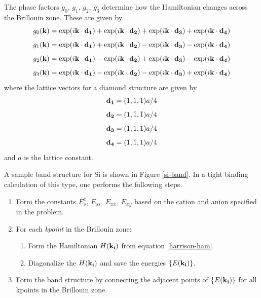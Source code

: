 The phase factors $g_0$, $g_1$, $g_2$, $g_3$ determine how the
Hamiltonian changes across the Brillouin zone. These are given by 
\begin{equation}
 g_0(\mathbf{k}) = \exp(i\mathbf{k}\cdot\mathbf{d_1})
    + \exp(i\mathbf{k}\cdot\mathbf{d_2})
    + \exp(i\mathbf{k}\cdot\mathbf{d_3})
    + \exp(i\mathbf{k}\cdot\mathbf{d_4})
\end{equation}
\begin{equation}
 g_1(\mathbf{k}) = \exp(i\mathbf{k}\cdot\mathbf{d_1})
    + \exp(i\mathbf{k}\cdot\mathbf{d_2})
    - \exp(i\mathbf{k}\cdot\mathbf{d_3})
    - \exp(i\mathbf{k}\cdot\mathbf{d_4})
\end{equation}
\begin{equation}
 g_2(\mathbf{k}) = \exp(i\mathbf{k}\cdot\mathbf{d_1})
    - \exp(i\mathbf{k}\cdot\mathbf{d_2})
    + \exp(i\mathbf{k}\cdot\mathbf{d_3})
    - \exp(i\mathbf{k}\cdot\mathbf{d_4})
\end{equation}
\begin{equation}
 g_3(\mathbf{k}) = \exp(i\mathbf{k}\cdot\mathbf{d_1})
    - \exp(i\mathbf{k}\cdot\mathbf{d_2})
    - \exp(i\mathbf{k}\cdot\mathbf{d_3})
    + \exp(i\mathbf{k}\cdot\mathbf{d_4})
\end{equation}
where the lattice vectors for a diamond structure are given by
\begin{equation}
 \mathbf{d_1} = (1,1,1)a/4
\end{equation}
\begin{equation}
 \mathbf{d_2} = (1,\bar{1},\bar{1})a/4
\end{equation}
\begin{equation}
 \mathbf{d_3} = (\bar{1},1,\bar{1})a/4
\end{equation}
\begin{equation}
 \mathbf{d_4} = (\bar{1},\bar{1},1)a/4
\end{equation}
and $a$ is the lattice constant.

A sample band structure for Si is shown in Figure \ref{si-band}. In a
tight binding calculation of this type, one performs the following
steps.
\begin{enumerate}
 \item Form the constants $E_s^c$, $E_{ss}$, $E_{xx}$, $E_{xy}$ based 
	on the cation and anion specified in the problem.
 \item For each \emph{kpoint}  in the Brillouin zone:
 \begin{enumerate}
   \item Form the Hamiltonian $H(\mathbf{k_i})$ from equation
	\ref{harrison-ham}.
   \item Diagonalize the $H(\mathbf{k_i})$ and save the energies
	$\{E(\mathbf{k_i})\}$.
 \end{enumerate}
 \item Form the band structure by connecting the adjacent points of 
	$\{E(\mathbf{k_i})\}$ for all kpoints in the Brillouin zone.
\end{enumerate}

